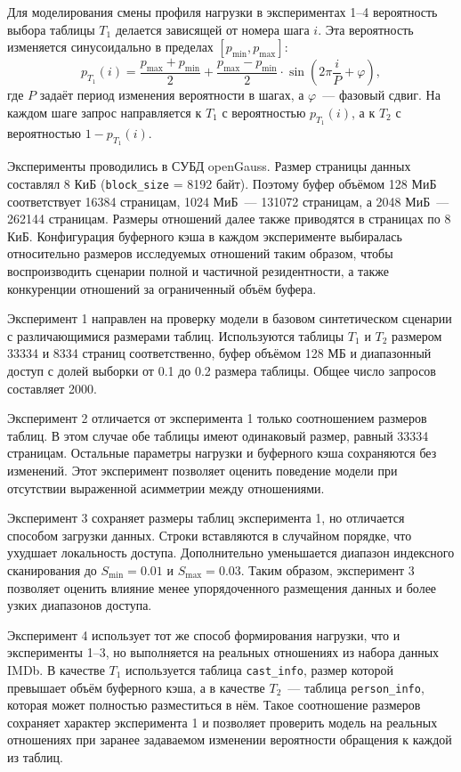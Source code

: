 Для моделирования смены профиля нагрузки в экспериментах 1--4 вероятность выбора таблицы \(T_1\) делается зависящей от номера шага \(i\). Эта вероятность изменяется синусоидально в пределах \([p_{\min}, p_{\max}]\):
\begin{equation}
p_{T_1}(i) =
\frac{p_{\max} + p_{\min}}{2}
+
\frac{p_{\max} - p_{\min}}{2}
\cdot
\sin\left(2\pi \frac{i}{P} + \varphi\right),
\end{equation}
где \(P\) задаёт период изменения вероятности в шагах, а \(\varphi\)~--- фазовый сдвиг. На каждом шаге запрос направляется к \(T_1\) с вероятностью \(p_{T_1}(i)\), а к \(T_2\) с вероятностью \(1-p_{T_1}(i)\).

Эксперименты проводились в СУБД openGauss. Размер страницы данных
составлял 8 КиБ (\texttt{block\_size} = 8192 байт). Поэтому буфер объёмом
128 МиБ соответствует 16384 страницам, 1024 МиБ~--- 131072 страницам,
а 2048 МиБ~--- 262144 страницам. Размеры отношений далее также приводятся
в страницах по 8 КиБ. Конфигурация буферного кэша в каждом эксперименте
выбиралась относительно размеров исследуемых отношений таким образом,
чтобы воспроизводить сценарии полной и частичной резидентности, а также
конкуренции отношений за ограниченный объём буфера.

Эксперимент 1 направлен на проверку модели в базовом синтетическом сценарии с различающимися размерами таблиц. Используются таблицы \(T_1\) и \(T_2\) размером 33334 и 8334 страниц соответственно, буфер объёмом 128 МБ и диапазонный доступ с долей выборки от 0.1 до 0.2 размера таблицы. Общее число запросов составляет 2000.

Эксперимент 2 отличается от эксперимента 1 только соотношением размеров таблиц. В этом случае обе таблицы имеют одинаковый размер, равный 33334 страницам. Остальные параметры нагрузки и буферного кэша сохраняются без изменений. Этот эксперимент позволяет оценить поведение модели при отсутствии выраженной асимметрии между отношениями.

Эксперимент 3 сохраняет размеры таблиц эксперимента 1, но отличается способом загрузки данных. Строки вставляются в случайном порядке, что ухудшает локальность доступа. Дополнительно уменьшается диапазон индексного сканирования до \(S_{\min}=0.01\) и \(S_{\max}=0.03\). Таким образом, эксперимент 3 позволяет оценить влияние менее упорядоченного размещения данных и более узких диапазонов доступа.

Эксперимент 4 использует тот же способ формирования нагрузки, что и
эксперименты 1--3, но выполняется на реальных отношениях из набора данных
IMDb. В качестве \(T_1\) используется таблица \texttt{cast\_info}, размер
которой превышает объём буферного кэша, а в качестве \(T_2\)~---
таблица \texttt{person\_info}, которая может полностью разместиться в нём.
Такое соотношение размеров сохраняет характер эксперимента 1 и позволяет
проверить модель на реальных отношениях при заранее задаваемом изменении
вероятности обращения к каждой из таблиц.

